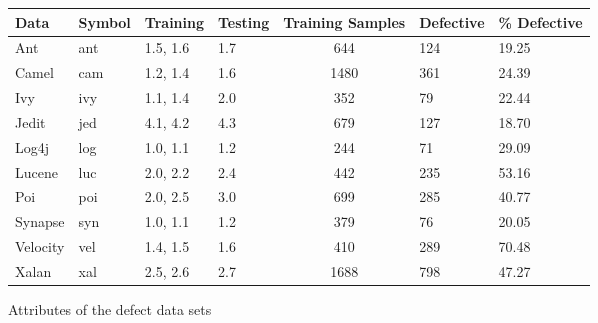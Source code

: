 \documentclass[10pt, journal, compsoc]{IEEEtran}
\begin{document}
\begin{figure}[!htbp]
  \renewcommand{\baselinestretch}{1.25}\begin{center}
    {\scriptsize
      \begin{tabular}{l@{~~~}l@{~~~}l@{~~~}l@{~~~}c@{~~~}l@{~~~}l@{~~~}}
        \hline
        \rowcolor{lightgray}
        Data & Symbol & Training & Testing & Training Samples& Defective &\% Defective \\\hline
        
        Ant & ant & 1.5, 1.6  &1.7 & 644&124&19.25\\
        
        Camel & cam & 1.2, 1.4 & 1.6 & 1480&361 & 24.39\\
        
        Ivy & ivy & 1.1, 1.4 & 2.0  & 352 & 79 & 22.44\\
        
        Jedit & jed & 4.1, 4.2 & 4.3 & 679 & 127 & 18.70\\
        
        Log4j & log & 1.0, 1.1 & 1.2 & 244 & 71 & 29.09\\
        
        Lucene & luc & 2.0, 2.2 & 2.4 & 442 & 235 & 53.16\\
        
        Poi & poi & 2.0, 2.5 & 3.0 & 699 & 285 & 40.77\\
        
        Synapse & syn & 1.0, 1.1 & 1.2 & 379 & 76 & 20.05\\
        
        Velocity & vel & 1.4, 1.5 & 1.6 & 410& 289 & 70.48\\
        
        Xalan & xal &2.5, 2.6 &2.7 & 1688 & 798 & 47.27\\\hline
      \end{tabular}}
    \end{center}
    \caption{Attributes of the defect data sets}\label{fig:attr}
  \end{figure}
\end{document}
